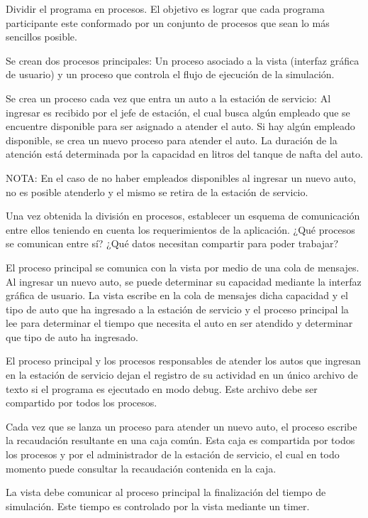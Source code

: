 \documentclass[12pt,a4paper,titlepage,oneside]{article}
\renewenvironment{itemize}{
 \begin{list}{}{
  \setlength{\leftmargin}{1.5em}
 }
}{
 \end{list}
}
\begin{document}
\begin{enumerate}
\item Dividir el programa en procesos. El objetivo es lograr que cada programa participante este conformado por un conjunto de procesos que sean lo más sencillos posible.

\begin{itemize}
\item[•] Se crean dos procesos principales: Un proceso asociado a la vista (interfaz gráfica de usuario) y un proceso que controla el flujo de ejecución de la simulación.
\item[•] Se crea un proceso cada vez que entra un auto a la estación de servicio: Al ingresar es recibido por el jefe de estación, el cual busca algún empleado que se encuentre disponible para ser asignado a atender el auto. Si hay algún empleado disponible, se crea un nuevo proceso para atender el auto. La duración de la atención está determinada por la capacidad en litros del tanque de nafta del auto.
\end{itemize}

NOTA: En el caso de no haber empleados disponibles al ingresar un nuevo auto, no es posible atenderlo y el mismo se retira de la estación de servicio.

\item Una vez obtenida la división en procesos, establecer un esquema de comunicación entre ellos teniendo en cuenta los requerimientos de la aplicación. ¿Qué procesos se comunican entre sí? ¿Qué datos necesitan compartir para poder trabajar?

\begin{itemize}
\item[•] El proceso principal se comunica con la vista por medio de una cola de mensajes. Al ingresar un nuevo auto, se puede determinar su capacidad mediante la interfaz gráfica de usuario. La vista escribe en la cola de mensajes dicha capacidad y el tipo de auto que ha ingresado a la estación de servicio y el proceso principal la lee para determinar el tiempo que necesita el auto en ser atendido y determinar que tipo de auto ha ingresado.
\item[•] El proceso principal y los procesos responsables de atender los autos que ingresan en la estación de servicio dejan el registro de su actividad en un único archivo de texto si el programa es ejecutado en modo debug. Este archivo debe ser compartido por todos los procesos.
\item[•] Cada vez que se lanza un proceso para atender un nuevo auto, el proceso escribe la recaudación resultante en una caja común. Esta caja es compartida por todos los procesos y por el administrador de la estación de servicio, el cual en todo momento puede consultar la recaudación contenida en la caja.
\item[•] La vista debe comunicar al proceso principal la finalización del tiempo de simulación. Este tiempo es controlado por la vista mediante un timer.
\end{itemize}


\end{enumerate}
\end{document}
